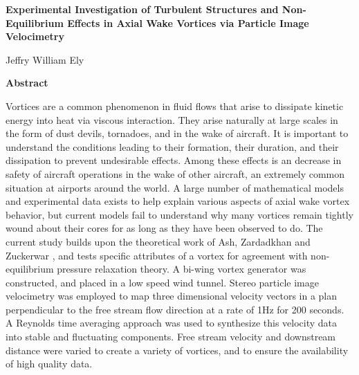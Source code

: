 \thispagestyle{plain}
\begin{center}
    \Large
    \textbf{Experimental Investigation of Turbulent Structures and 
    Non-Equilibrium Effects in Axial Wake Vortices via Particle Image 
    Velocimetry}
    
    \vspace{0.4cm}
    \large
    
    \vspace{0.4cm}
    Jeffry William Ely
    
    \vspace{0.9cm}
    \textbf{Abstract}
\end{center}


Vortices are a common phenomenon in fluid flows that arise to dissipate kinetic energy into heat via viscous interaction. They arise naturally at large scales in the form of dust devils, tornadoes, and in the wake of aircraft. It is important to understand the conditions leading to their formation, their duration, and their dissipation to prevent undesirable effects. Among these effects is an decrease in safety of aircraft operations in the wake of other aircraft, an extremely common situation at airports around the world. A large number of mathematical models and experimental data exists to help explain various aspects of axial wake vortex behavior, but current models fail to understand why many vortices remain tightly wound about their cores for as long as they have been observed to do. The current study builds upon the theoretical work of Ash, Zardadkhan and Zuckerwar \cite{ash2011}, and tests specific attributes of a vortex for agreement with non-equilibrium pressure relaxation theory. A bi-wing vortex generator was constructed, and placed in a low speed wind tunnel. Stereo particle image velocimetry was employed to map three dimensional velocity vectors in a plan perpendicular to the free stream flow direction at a rate of 1Hz for 200 seconds. A Reynolds time averaging approach was used to synthesize this velocity data into stable and fluctuating components. Free stream velocity and downstream distance were varied to create a variety of vortices, and to ensure the availability of high quality data.
